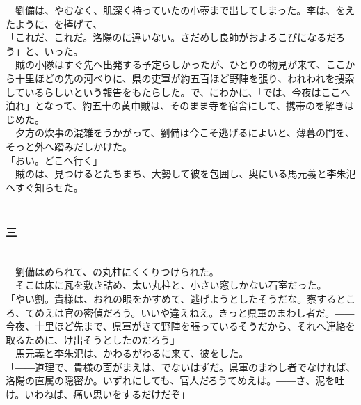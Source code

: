 \documentclass[
  paper=a5,
  fontsize=10pt,
  jafontsize=9.5pt,
  tate,                  %
  open_bracket_pos=nibu, %
]{jlreq}
\begin{document}
　劉備は、やむなく、肌深く持っていたの小壺まで出してしまった。李は、をえたように、を捧げて、\\


「これだ、これだ。洛陽のに違いない。さだめし良師がおよろこびになるだろう」と、いった。\\


　賊の小隊はすぐ先へ出発する予定らしかったが、ひとりの物見が来て、ここから十里ほどの先の河べりに、県の吏軍が約五百ほど野陣を張り、われわれを捜索しているらしいという報告をもたらした。で、にわかに、「では、今夜はここへ泊れ」となって、約五十の黄巾賊は、そのまま寺を宿舎にして、携帯のを解きはじめた。\\


　夕方の炊事の混雑をうかがって、劉備は今こそ逃げるによいと、薄暮の門を、そっと外へ踏みだしかけた。\\


「おい。どこへ行く」\\


　賊のは、見つけるとたちまち、大勢して彼を包囲し、奥にいる馬元義と李朱氾へすぐ知らせた。\\

\\

\subsubsection{三}

\\


　劉備はめられて、の丸柱にくくりつけられた。\\


　そこは床に瓦を敷き詰め、太い丸柱と、小さい窓しかない石室だった。\\


「やい劉。貴様は、おれの眼をかすめて、逃げようとしたそうだな。察するところ、てめえは官の密偵だろう。いいや違えねえ。きっと県軍のまわし者だ。――今夜、十里ほど先まで、県軍がきて野陣を張っているそうだから、それへ連絡を取るために、け出そうとしたのだろう」\\


　馬元義と李朱氾は、かわるがわるに来て、彼をした。\\


「――道理で、貴様の面がまえは、でないはずだ。県軍のまわし者でなければ、洛陽の直属の隠密か。いずれにしても、官人だろうてめえは。――さ、泥を吐け。いわねば、痛い思いをするだけだぞ」\\
\end{document}
